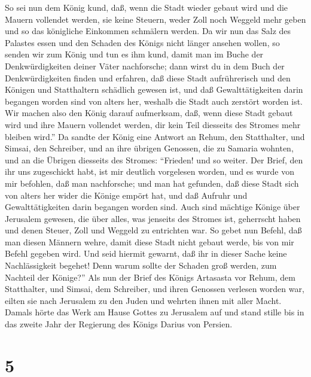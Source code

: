  So sei nun dem König kund, daß, wenn die Stadt wieder
gebaut wird und die Mauern vollendet werden, sie keine Steuern, weder
Zoll noch Weggeld mehr geben und so das königliche Einkommen schmälern
werden.  Da wir nun das Salz des Palastes essen und den
Schaden des Königs nicht länger ansehen wollen, so senden wir zum König
und tun es ihm kund,  damit man im Buche der
Denkwürdigkeiten deiner Väter nachforsche; dann wirst du in dem Buch der
Denkwürdigkeiten finden und erfahren, daß diese Stadt aufrührerisch und
den Königen und Statthaltern schädlich gewesen ist, und daß
Gewalttätigkeiten darin begangen worden sind von alters her, weshalb die
Stadt auch zerstört worden ist.  Wir machen also den
König darauf aufmerksam, daß, wenn diese Stadt gebaut wird und ihre
Mauern vollendet werden, dir kein Teil diesseits des Stromes mehr
bleiben wird.''  Da sandte der König eine Antwort an
Rehum, den Statthalter, und Simsai, den Schreiber, und an ihre übrigen
Genossen, die zu Samaria wohnten, und an die Übrigen diesseits des
Stromes: ``Frieden! und so weiter.  Der Brief, den ihr
uns zugeschickt habt, ist mir deutlich vorgelesen worden,
 und es wurde von mir befohlen, daß man nachforsche; und
man hat gefunden, daß diese Stadt sich von alters her wider die Könige
empört hat, und daß Aufruhr und Gewalttätigkeiten darin begangen worden
sind.  Auch sind mächtige Könige über Jerusalem gewesen,
die über alles, was jenseits des Stromes ist, geherrscht haben und denen
Steuer, Zoll und Weggeld zu entrichten war.  So gebet nun
Befehl, daß man diesen Männern wehre, damit diese Stadt nicht gebaut
werde, bis von mir Befehl gegeben wird.  Und seid hiermit
gewarnt, daß ihr in dieser Sache keine Nachlässigkeit begehet! Denn
warum sollte der Schaden groß werden, zum Nachteil der Könige?''
 Als nun der Brief des Königs Artasasta vor Rehum, dem
Statthalter, und Simsai, dem Schreiber, und ihren Genossen verlesen
worden war, eilten sie nach Jerusalem zu den Juden und wehrten ihnen mit
aller Macht.  Damals hörte das Werk am Hause Gottes zu
Jerusalem auf und stand stille bis in das zweite Jahr der Regierung des
Königs Darius von Persien.

\hypertarget{section-4}{%
\section{5}\label{section-4}}

